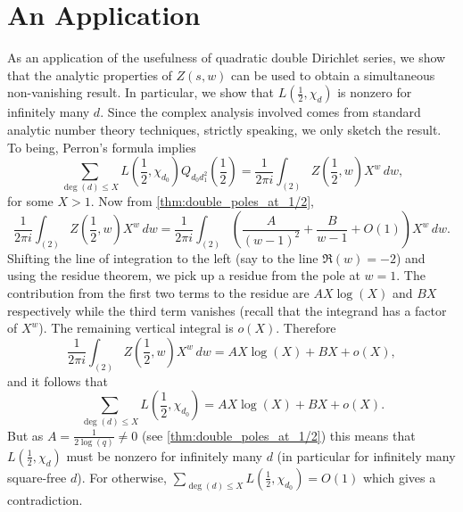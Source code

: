 \documentclass[12pt,reqno,oneside]{amsart}
\begin{document}
\section*{An Application}
    As an application of the usefulness of quadratic double Dirichlet series, we show that the analytic properties of $Z(s,w)$ can be used to obtain a simultaneous non-vanishing result. In particular, we show that $L\left(\frac{1}{2},\chi_{d}\right)$ is nonzero for infinitely many $d$. Since the complex analysis involved comes from standard analytic number theory techniques, strictly speaking, we only sketch the result. To being, Perron's formula implies
    \[
        \sum_{\deg(d) \le X}L\left(\frac{1}{2},\chi_{d_{0}}\right)Q_{d_{0}d_{1}^{2}}\left(\frac{1}{2}\right) = \frac{1}{2\pi i}\int_{(2)}Z\left(\frac{1}{2},w\right)X^{w}\,dw,
    \]
    for some $X > 1$. Now from \cref{thm:double_poles_at_1/2},
    \[
        \frac{1}{2\pi i}\int_{(2)}Z\left(\frac{1}{2},w\right)X^{w}\,dw = \frac{1}{2\pi i}\int_{(2)}\left(\frac{A}{(w-1)^{2}}+\frac{B}{w-1}+O(1)\right)X^{w}\,dw.
    \]
    Shifting the line of integration to the left (say to the line $\Re(w) = -2$) and using the residue theorem, we pick up a residue from the pole at $w = 1$. The contribution from the first two terms to the residue are $AX\log(X)$ and $BX$ respectively while the third term vanishes (recall that the integrand has a factor of $X^{w}$). The remaining vertical integral is $o(X)$. Therefore
    \[
        \frac{1}{2\pi i}\int_{(2)}Z\left(\frac{1}{2},w\right)X^{w}\,dw = AX\log(X)+BX+o(X),
    \]
    and it follows that
    \[
        \sum_{\deg(d) \le X}L\left(\frac{1}{2},\chi_{d_{0}}\right) = AX\log(X)+BX+o(X).
    \]
    But as $A = \frac{1}{2\log(q)} \neq 0$ (see \cref{thm:double_poles_at_1/2}) this means that $L\left(\frac{1}{2},\chi_{d}\right)$ must be nonzero for infinitely many $d$ (in particular for infinitely many square-free $d$). For otherwise, $\sum_{\deg(d) \le X}L\left(\frac{1}{2},\chi_{d_{0}}\right) = O(1)$ which gives a contradiction.
\end{document}
